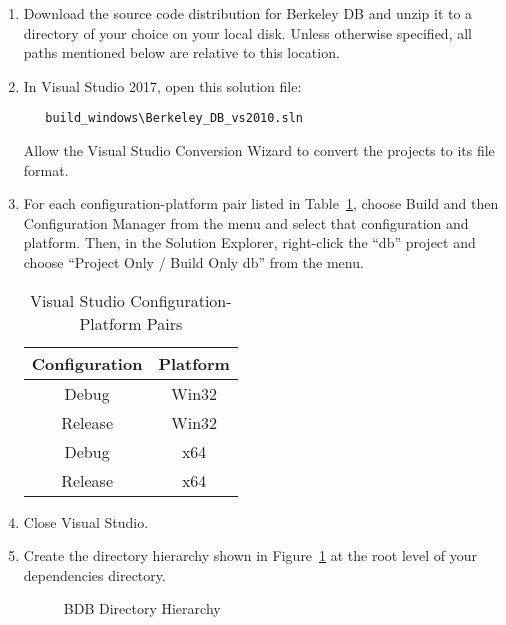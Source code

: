 \begin{enumerate}
\item\label{step-download}Download the source code distribution for Berkeley DB and unzip it to a directory of your choice on your local disk.  Unless otherwise specified, all paths mentioned below are relative to this location.

\item In Visual Studio 2017, open this solution file:
	\begin{verbatim}
   build_windows\Berkeley_DB_vs2010.sln
	\end{verbatim}
Allow the Visual Studio Conversion Wizard to convert the projects to its file format.

\item For each configuration-platform pair listed in Table~\ref{vs-config-platform-pairs}, choose Build and then Configuration Manager from the menu and select that configuration and platform.  Then, in the Solution Explorer, right-click the ``db'' project and choose ``Project Only / Build Only db'' from the menu.

	\begin{table}[htbp]
		\centering
		\begin{tabular}{cc}
			\toprule
			\textbf{Configuration} & \textbf{Platform} \\
			\midrule
			Debug   & Win32 \\
			Release & Win32 \\
			Debug   & x64   \\
			Release & x64   \\
			\bottomrule
		\end{tabular}
		\caption{Visual Studio Configuration-Platform Pairs}
		\label{vs-config-platform-pairs}
	\end{table}

\item Close Visual Studio.

\item\label{step-creates-dirs}Create the directory hierarchy shown in Figure~\ref{fig:bdbDirTree} at the root level of your dependencies directory.
\begin{figure}[htbp]
	\centering
	\begin{minipage}[t]{3in}
	\end{minipage}
	\caption{BDB Directory Hierarchy}
	\label{fig:bdbDirTree}
\end{figure}


\end{enumerate}
